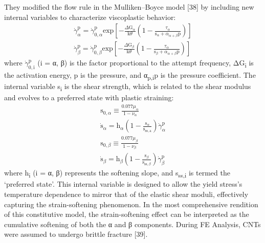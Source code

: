 \documentclass{article}
\begin{document}
They modified the flow rule in the Mulliken–Boyce model [38] by including new internal variables to characterize viscoplastic behavior:
\begin{gather*}
\dot{\gamma}^{\mathrm{p}}_\alpha = \dot{\gamma}^{\mathrm{p}}_{0,\alpha}\mathrm{exp}\left[-\frac{\Delta\mathrm{G}_\alpha}{\mathrm{k}\theta}\left(1 - \frac{\tau_\alpha}{\mathrm{s}_\alpha + \alpha_{\alpha+\beta}\mathrm{p}}\right)\right] \tag{32}\\
\dot{\gamma}^{\mathrm{p}}_\beta = \dot{\gamma}^{\mathrm{p}}_{0,\beta}\mathrm{exp}\left[-\frac{\Delta\mathrm{G}_\beta}{\mathrm{k}\theta}\left(1 - \frac{\tau_\alpha}{\mathrm{s}_\beta + \alpha_{\alpha+\beta}\mathrm{p}}\right)\right] \tag{33}
\end{gather*}
\noindent where $\dot{\gamma}^{\mathrm{p}}_{0,\mathrm{i}}$ (i = α, β) is the factor proportional to the attempt frequency, ΔG\textsubscript{i} is the activation energy, p is the pressure, and α\textsubscript{p,i}p is the pressure coefficient. The internal variable s\textsubscript{i} is the shear strength, which is related to the shear modulus and evolves to a preferred state with plastic straining:
\begin{gather*}
\mathrm{s}_{0,\alpha} \equiv \frac{0.077\mu_\alpha}{1 - \nu_\alpha} \tag{34}\\
\dot{\mathrm{s}}_\alpha = \mathrm{h}_\alpha\left(1 - \frac{\mathrm{s}_\alpha}{\mathrm{s}_{\mathrm{ss,a}}}\right)\dot{\gamma}^{\mathrm{p}}_\alpha \tag{35}\\
\mathrm{s}_{0,\beta} \equiv \frac{0.077\mu_\beta}{1 - \nu_\beta} \tag{36}\\
\dot{\mathrm{s}}_\beta = \mathrm{h}_\beta\left(1 - \frac{\mathrm{s}_\beta}{\mathrm{s}_{\mathrm{ss},\beta}}\right)\dot{\gamma}^{\mathrm{p}}_\beta \tag{37}
\end{gather*}
\noindent where h\textsubscript{i} (i = α, β) represents the softening slope, and s\textsubscript{ss,i} is termed the ‘preferred state’. This internal variable is designed to allow the yield stress’s temperature dependence to mirror that of the elastic shear moduli, effectively capturing the strain-softening phenomenon. In the most comprehensive rendition of this constitutive model, the strain-softening effect can be interpreted as the cumulative softening of both the α and β components. During FE Analysis, CNTs were assumed to undergo brittle fracture [39].
\end{document}

